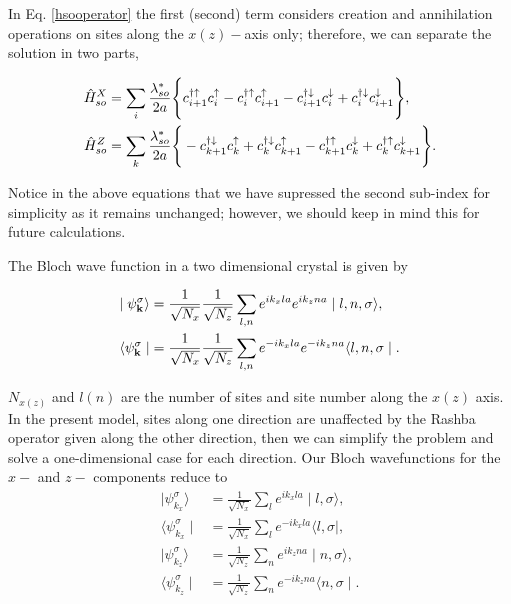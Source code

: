 \documentclass[10pt,prb,showpacs,amssymb,floatfix]{revtex4-1}
\begin{document}
In Eq. \eqref{hsooperator} the first (second) term considers creation and annihilation operations on sites along the $x(z)-$axis only; therefore, we can separate the solution in two parts,

\begin{align}
\label{hsoxx0}
\hat H^X_{so} &= \sum_{i} \frac{\lambda_{so}^*}{2a}  \Bigg{\{} c_{i+1}^{\dagger \uparrow} c_{i}^\uparrow - c_{i}^{\dagger \uparrow} c_{i+1}^\uparrow  - c_{i+1}^{\dagger \downarrow} c_{i}^\downarrow + c_{i}^{\dagger \downarrow} c_{i+1}^\downarrow \Bigg{\}}, \\
\hat H^Z_{so} &= \sum_{k}  \frac{\lambda_{so}^*}{2a} \Bigg{\{} - c_{k+1}^{\dagger \downarrow} c_{k}^\uparrow + c_{k}^{\dagger \downarrow} c_{k+1}^\uparrow   - c_{k+1}^{\dagger \uparrow} c_{k}^\downarrow +  c_{k}^{\dagger \uparrow} c_{k+1}^\downarrow \Bigg{\}}.
\label{hsozz0}
\end{align}

Notice in the above equations that we have supressed the second sub-index for simplicity as it remains unchanged; however, we should keep in mind this for future calculations.

The Bloch wave function in a two dimensional crystal is given by

\begin{align}
\mid \psi^\sigma_{\bf k} \rangle &= \frac{1}{\sqrt{N_x}}\frac{1}{\sqrt{N_z}} \sum_{l, n} e^{ik_xla}e^{ik_zna} \mid l, n,\sigma\rangle, \\
\langle \psi^\sigma_{\bf k} \mid &= \frac{1}{\sqrt{N_x}}\frac{1}{\sqrt{N_z}} \sum_{l, n} e^{-ik_xla}e^{-ik_zna} \langle l, n,\sigma\mid.
\end{align}

$N_{x(z)}$ and $l (n)$ are the number of sites and site number along the $x (z)$ axis. In the present model, sites along one direction are unaffected by the Rashba operator given along the other direction, then we can simplify the problem and solve a one-dimensional case for each direction. Our Bloch wavefunctions for the $x-$ and $z-$ components reduce to
\begin{align}
\mid \psi^\sigma_{k_x} \rangle &= \frac{1}{\sqrt{N_x}} \sum_{l} e^{ik_xla} \mid l,\sigma\rangle, \\
\langle \psi^\sigma_{k_x} \mid &= \frac{1}{\sqrt{N_x}} \sum_{l} e^{-ik_xla} \langle l,\sigma\mid, \\
\mid \psi^\sigma_{k_z} \rangle &= \frac{1}{\sqrt{N_z}} \sum_{n} e^{ik_zna} \mid n,\sigma\rangle, \\
\langle \psi^\sigma_{k_z} \mid &= \frac{1}{\sqrt{N_z}} \sum_{n} e^{-ik_zna} \langle n,\sigma\mid.
\end{align}
\end{document}
